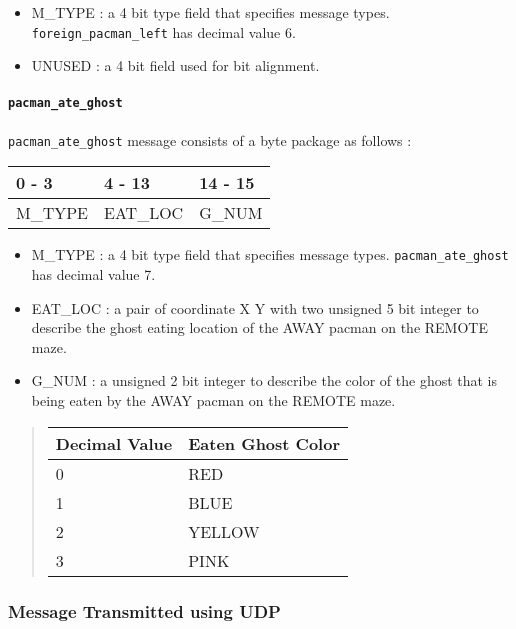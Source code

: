 \documentclass[]{article}
\let\oldparagraph\paragraph
\renewcommand{\paragraph}[1]{\oldparagraph{#1}\mbox{}}
\begin{document}
\begin{itemize}
\item
  M\_TYPE : a 4 bit type field that specifies message types.
  \texttt{foreign\_pacman\_left} has decimal value 6.
\item
  UNUSED : a 4 bit field used for bit alignment.
\end{itemize}

\hypertarget{pacman_ate_ghost}{%
\paragraph{\texorpdfstring{\texttt{pacman\_ate\_ghost}}{pacman\_ate\_ghost}}\label{pacman_ate_ghost}}

\texttt{pacman\_ate\_ghost} message consists of a byte package as
follows :

\begin{longtable}[]{@{}lll@{}}
\toprule
0 - 3 & 4 - 13 & 14 - 15\tabularnewline
\midrule
\endhead
M\_TYPE & EAT\_LOC & G\_NUM\tabularnewline
\bottomrule
\end{longtable}

\begin{itemize}
\item
  M\_TYPE : a 4 bit type field that specifies message types.
  \texttt{pacman\_ate\_ghost} has decimal value 7.
\item
  EAT\_LOC : a pair of coordinate X Y with two unsigned 5 bit integer to
  describe the ghost eating location of the AWAY pacman on the REMOTE
  maze.
\item
  G\_NUM : a unsigned 2 bit integer to describe the color of the ghost
  that is being eaten by the AWAY pacman on the REMOTE maze.
\end{itemize}

\begin{quote}
\begin{longtable}[]{@{}ll@{}}
\toprule
Decimal Value & Eaten Ghost Color\tabularnewline
\midrule
\endhead
0 & RED\tabularnewline
1 & BLUE\tabularnewline
2 & YELLOW\tabularnewline
3 & PINK\tabularnewline
\bottomrule
\end{longtable}
\end{quote}

\hypertarget{message-transmitted-using-udp}{%
\subsubsection{Message Transmitted using
UDP}\label{message-transmitted-using-udp}}
\end{document}
